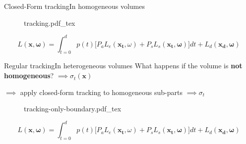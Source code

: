 \documentclass[
  english,            %
  aspectratio=169,    %
]{tumbeamer}
\newcommand\bomega[0]{\bm{\omega}}
\begin{document}
\begin{frame}{Closed-Form tracking}{In homogeneous volumes}
\begin{figure}[ht]
    \centering
    \def\svgwidth{0.7\columnwidth}
    {tracking.pdf_tex}
\end{figure}

\begin{equation}
    L(\bm{x}, \bm{\omega}) = \int_{t=0}^{d} p(t) 
    \Big[ P_a L_e(\bm{x_t}, \omega)
    + P_s L_s(\bm{x_t}, \bomega)
    \Big]dt + L_d(\bm{x_d}, \bm{\omega})
\end{equation}
\end{frame}

\begin{frame}{Regular tracking}{In heterogeneous volumes}
  What happens if the volume is \textbf{not homogeneous}? 
  \hspace{5.4em}$\implies$$\sigma_t(\bm{x})$

  $\implies$ apply closed-form tracking to homogeneous sub-parts
  \hspace{2em}$\implies$$\sigma_t$

\begin{figure}[ht]
    \centering
    \def\svgwidth{0.3\columnwidth}
    {tracking-only-boundary.pdf_tex}
\end{figure}

\begin{equation}
    L(\bm{x}, \bm{\omega}) = \int_{t=0}^{d} p(t) 
    \Big[ P_a L_e(\bm{x_t}, \omega)
    + P_s L_s(\bm{x_t}, \bomega)
    \Big]dt + L_d(\bm{x_d}, \bm{\omega})
\end{equation}
\end{frame}
\end{document}
